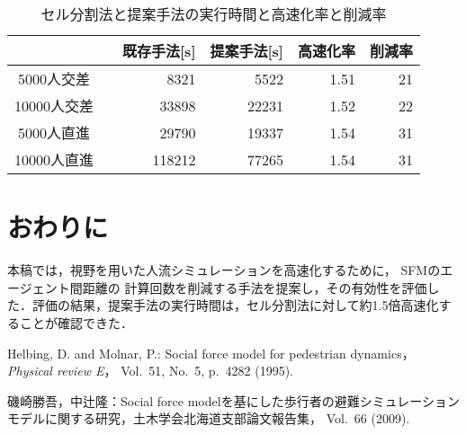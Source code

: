 \documentclass{maelab_y}
\begin{document}
\begin{table}[hbtp]
  \begin{center}
    \caption{セル分割法と提案手法の実行時間と高速化率と削減率}
    \label{tab:result}
    \begin{tabular}{c|c|c|c|c}
      \hline \hline
        &　既存手法[s] & 提案手法[s] & 高速化率 & 削減率 \\
      \hline
      5000人交差 & \multicolumn{1}{|r|}{8321} &
       \multicolumn{1}{|r|}{5522} &
       \multicolumn{1}{|r|}{1.51} &
       \multicolumn{1}{|r}{21} \\
      \hline
      10000人交差 &
      \multicolumn{1}{|r|}{33898} &
      \multicolumn{1}{|r|}{22231} &
      \multicolumn{1}{|r|}{1.52}  &
      \multicolumn{1}{|r}{22} \\
      \hline
      5000人直進 &
      \multicolumn{1}{|r|}{29790} &
      \multicolumn{1}{|r|}{19337} &
      \multicolumn{1}{|r|}{1.54}  &
      \multicolumn{1}{|r}{31} \\
      \hline
      10000人直進 &
      \multicolumn{1}{|r|}{118212} &
      \multicolumn{1}{|r|}{77265} &
      \multicolumn{1}{|r|}{1.54} &
      \multicolumn{1}{|r}{31}  \\
      \hline
    \end{tabular}
  \end{center}
\end{table}

\section{おわりに}
本稿では，視野を用いた人流シミュレーションを高速化するために，
SFMのエージェント間距離の
計算回数を削減する手法を提案し，その有効性を評価した．評価の結果，提案手法の実行時間は，セル分割法に対して約1.5倍高速化することが確認できた．

\begin{thebibliography}{9}
{\footnotesize

  Helbing, D. and Molnar, P.: Social force model for pedestrian dynamics，{\em
    Physical review E}， Vol.~51, No.~5, p.\ 4282 (1995).

  磯崎勝吾，中辻隆：Social force
  modelを基にした歩行者の避難シミュレーションモデルに関する研究，土木学会北海道支部論文報告集，
  Vol.~66 (2009).
}

\end{thebibliography}
\end{document}
